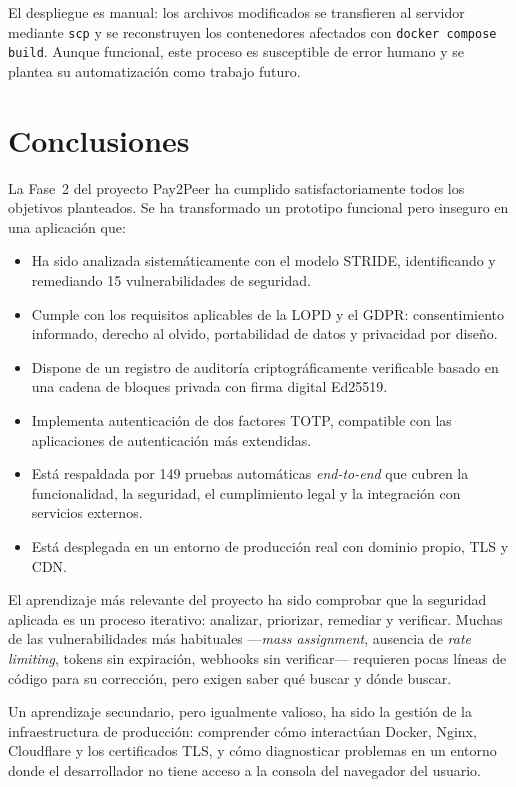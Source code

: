 El despliegue es manual: los archivos modificados se transfieren al servidor mediante \texttt{scp} y se reconstruyen los contenedores afectados con \texttt{docker compose build}. Aunque funcional, este proceso es susceptible de error humano y se plantea su automatización como trabajo futuro.

\chapter{Conclusiones}\label{ch:conclusiones}

La Fase~2 del proyecto Pay2Peer ha cumplido satisfactoriamente todos los objetivos planteados. Se ha transformado un prototipo funcional pero inseguro en una aplicación que:

\begin{itemize}
  \item Ha sido analizada sistemáticamente con el modelo STRIDE, identificando y remediando 15 vulnerabilidades de seguridad.
  \item Cumple con los requisitos aplicables de la LOPD y el GDPR: consentimiento informado, derecho al olvido, portabilidad de datos y privacidad por diseño.
  \item Dispone de un registro de auditoría criptográficamente verificable basado en una cadena de bloques privada con firma digital Ed25519.
  \item Implementa autenticación de dos factores TOTP, compatible con las aplicaciones de autenticación más extendidas.
  \item Está respaldada por 149 pruebas automáticas \emph{end-to-end} que cubren la funcionalidad, la seguridad, el cumplimiento legal y la integración con servicios externos.
  \item Está desplegada en un entorno de producción real con dominio propio, TLS y CDN.
\end{itemize}

El aprendizaje más relevante del proyecto ha sido comprobar que la seguridad aplicada es un proceso iterativo: analizar, priorizar, remediar y verificar. Muchas de las vulnerabilidades más habituales ---\emph{mass assignment}, ausencia de \emph{rate limiting}, tokens sin expiración, webhooks sin verificar--- requieren pocas líneas de código para su corrección, pero exigen saber qué buscar y dónde buscar.

Un aprendizaje secundario, pero igualmente valioso, ha sido la gestión de la infraestructura de producción: comprender cómo interactúan Docker, Nginx, Cloudflare y los certificados TLS, y cómo diagnosticar problemas en un entorno donde el desarrollador no tiene acceso a la consola del navegador del usuario.

